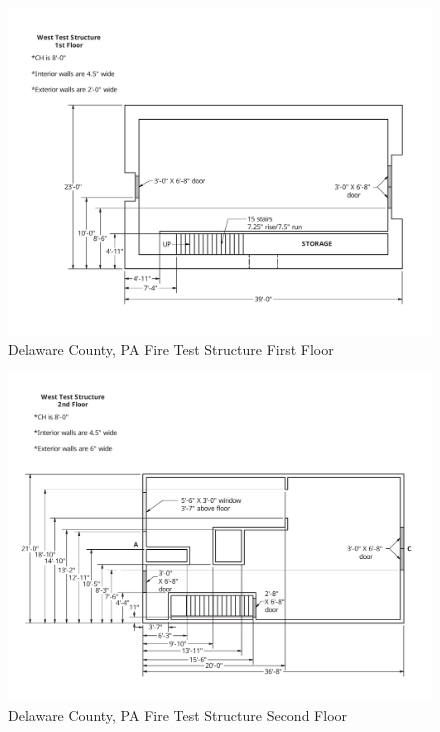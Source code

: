 \documentclass{article}
\begin{document}
\clearpage

\begin{figure}[!ht]
	\centering
	\includegraphics[width=5in]{Figures/Air_Entrainment/West_Test_Structure_1st_Floor_original_nodim.pdf}
	\caption{Delaware County, PA Fire Test Structure First Floor}
	\label{fig:Delaware_County,_PA_Fire_Test_Structure_First_Floor}
\end{figure}

\begin{figure}[!ht]
	\centering
	\includegraphics[width=5in]{Figures/Air_Entrainment/West_Test_Structure_2nd_Floor_nodim.pdf}
	\caption{Delaware County, PA Fire Test Structure Second Floor}
	\label{fig:Delaware_County,_PA_Fire_Test_Structure_Second_Floor}
\end{figure}
\end{document}
